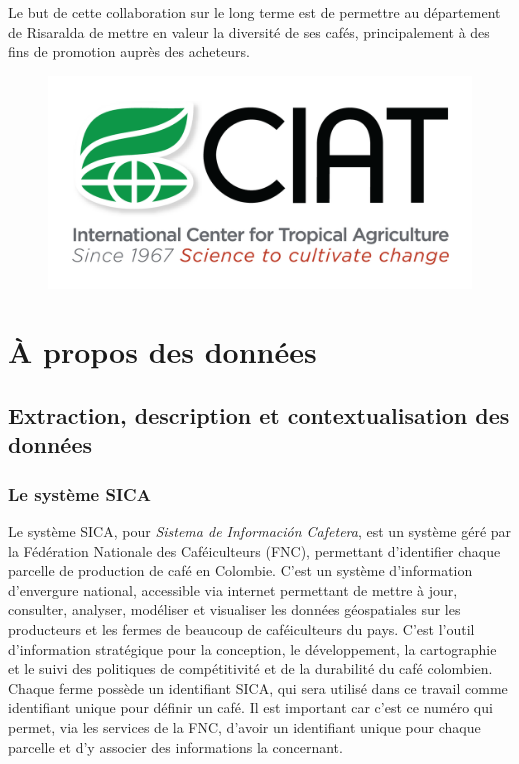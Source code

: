 \noindent Le but de cette collaboration sur le long terme est de permettre au département de Risaralda de mettre en valeur la diversité de ses cafés, principalement à des fins de promotion auprès des acheteurs. \\

\begin{figure}
	\centering
	\includegraphics[width=0.7\linewidth]{img/CIAT_logo_light_PNG/CIAT-Logo-1275x640}
	
	\label{fig:ciat-logo-1275x640}
\end{figure}


\chapter{À propos des données}

\section{Extraction, description et contextualisation des données}

\subsection{Le système SICA}Le système SICA, pour \textit{Sistema de Información Cafetera}, est un système géré par la Fédération Nationale des Caféiculteurs (FNC), permettant d'identifier chaque parcelle de production de café en Colombie. C'est un système d'information d'envergure national, accessible via internet permettant de mettre à jour, consulter, analyser, modéliser et visualiser les données géospatiales sur les producteurs et les fermes de beaucoup de caféiculteurs du pays. C'est l'outil d'information stratégique pour la conception, le développement, la cartographie et le suivi des politiques de compétitivité et de la durabilité du café colombien\cite{SICA}. Chaque ferme possède un identifiant SICA, qui sera utilisé dans ce travail comme identifiant unique pour définir un café. Il est important car c'est ce numéro qui permet, via les services de la FNC, d'avoir un identifiant unique pour chaque parcelle et d'y associer des informations la concernant.  

